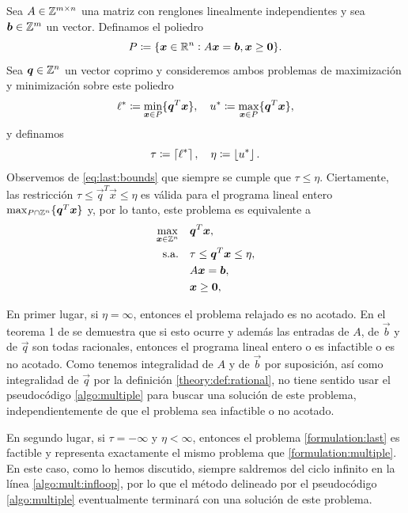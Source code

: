 Sea $A \in \mathbb{Z}^{m \times n}$ una matriz con renglones linealmente independientes y sea $\boldsymbol{b} \in
\mathbb{Z}^m$ un vector. Definamos el poliedro
\begin{equation*}
	P \coloneq \lbrace  \boldsymbol{x} \in \mathbb{R}^n \vcentcolon A\boldsymbol{x} = \boldsymbol{b}, \boldsymbol{x} \geq \boldsymbol{0}  \rbrace.
\end{equation*}
Sea $\boldsymbol{q} \in \mathbb{Z}^n$ un vector coprimo y consideremos ambos problemas de maximización y
minimización sobre este poliedro
\begin{equation}
	\label{eq:last:bounds}
	\ell^* \coloneq \min_{\boldsymbol{x} \in P}\lbrace \boldsymbol{q}^T\boldsymbol{x} \rbrace,\quad
	u^* \coloneq \max_{\boldsymbol{x} \in P}\lbrace \boldsymbol{q}^T\boldsymbol{x} \rbrace,
\end{equation}
y definamos
\begin{equation}
	\tau \coloneq \left\lceil \ell^* \right\rceil,\quad \eta \coloneq \left\lfloor u^* \right\rfloor.
\end{equation}
Observemos de \eqref{eq:last:bounds} que siempre se cumple que $\tau \leq \eta$. Ciertamente, las
restricción $\tau \leq \vec{q}^T\vec{x} \leq \eta$ es válida para el programa lineal entero $\max_{P
\cap \mathbb{Z}^n} \lbrace \boldsymbol{q}^T\boldsymbol{x} \rbrace$ y, por lo tanto, este problema es equivalente a 
\begin{subequations}
	\label{formulation:last}
	\begin{align}
		\max_{\boldsymbol{x} \in \mathbb{Z}^n} \quad
			& \boldsymbol{q}^T\boldsymbol{x}, \label{formulation:last:objective} \\
		\text{s.a.} \quad
			& \tau \leq \boldsymbol{q}^T\boldsymbol{x} \leq \eta, \\
			& A\boldsymbol{x} = \boldsymbol{b}, \label{formulation:last:constraints} \\
			& \boldsymbol{x} \geq \boldsymbol{0}, \nonumber
	\end{align}
\end{subequations}

En primer lugar, si $\eta = \infty$, entonces el problema relajado es no acotado. En el teorema 1 de
\cite{goldman} se demuestra que si esto ocurre y además las entradas de $A$, de $\vec{b}$ y de
$\vec{q}$ son todas racionales, entonces el programa lineal entero o es infactible o es no acotado.
Como tenemos integralidad de $A$ y de $\vec{b}$ por suposición, así como integralidad de $\vec{q}$
por la definición \ref{theory:def:rational}, no tiene sentido usar el pseudocódigo
\ref{algo:multiple} para buscar una solución de este problema, independientemente de que el
problema sea infactible o no acotado.

En segundo lugar, si $\tau = -\infty$ y $\eta < \infty$, entonces el problema
\eqref{formulation:last} es factible y representa exactamente el mismo problema que
\eqref{formulation:multiple}. En este caso, como lo hemos discutido, siempre saldremos del ciclo
infinito en la línea \ref{algo:mult:infloop}, por lo que el método delineado por el pseudocódigo
\ref{algo:multiple} eventualmente terminará con una solución de este problema.

